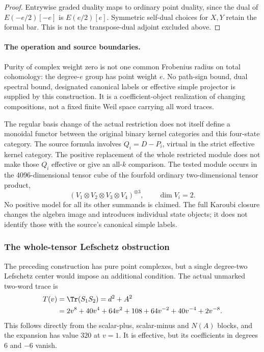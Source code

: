 \documentclass[11pt,a4paper]{article}
\theoremstyle{named}\newtheorem{finding}{Finding}[section]
\theoremstyle{definition}\newtheorem{definition}[finding]{Definition}
\theoremstyle{remark}\newtheorem{remark}[finding]{Remark}
\begin{document}
\begin{proof}
Entrywise graded duality maps to ordinary point
duality, since the dual of \(E(-e/2)[-e]\) is
\(E(e/2)[e]\). Symmetric self-dual choices for
\(X,Y\) retain the formal bar. This is not the
transpose-dual adjoint excluded above.
\end{proof}

\paragraph{The operation and source boundaries.}
Purity of complex weight zero is not one common
Frobenius radius on total cohomology: the degree-\(e\)
group has point weight \(e\).
No path-sign bound, dual spectral bound, designated
canonical labels or effective simple projector
is supplied by this construction.
It is a coefficient-object realization of changing
compositions, not a fixed finite Weil space carrying
all word traces.

The regular basis change of the actual restriction
does not itself define a monoidal functor between
the original binary kernel categories and this
four-state category. The source formula involves
\(Q_i=D-P_i\), virtual in the strict effective
kernel category. The positive replacement of the
whole restricted module does not make those
\(Q_i\) effective or give an all-\(k\) comparison.
The tested module occurs in the 4096-dimensional
tensor cube of the fourfold ordinary two-dimensional
tensor product,
\[
                   (V_1\otimes V_2\otimes V_3\otimes V_4)^{\otimes3},
                       \qquad \dim V_i=2.
\]
No positive model for all its other summands is
claimed. The full Karoubi closure changes the
algebra image and introduces individual state
objects; it does not identify those with the
source's canonical simple labels.

\subsubsection{The whole-tensor Lefschetz obstruction}

The preceding construction has pure point
complexes, but a single degree-two Lefschetz
center would impose an additional condition.
The actual unmarked two-word trace is
\begin{align}\label{eq:positiveIteratedWholeTrace}
 T(v)&=\Tr(S_1S_2)=d^2+A^2\\
 &=2v^8+40v^4+64v^2+108
                  +64v^{-2}+40v^{-4}+2v^{-8}.\notag
\end{align}
This follows directly from the scalar-plus,
scalar-minus and \(N(A)\) blocks, and the
expansion has value \(320\) at \(v=1\).
It is effective, but its coefficients in
degrees \(6\) and \(-6\) vanish.
\end{document}
